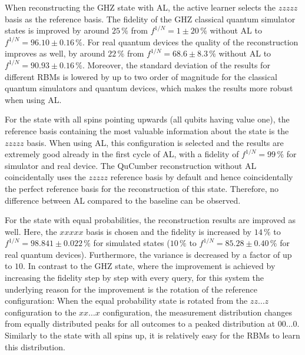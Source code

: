 \documentclass[pra,aps,showpacs,groupedaddress,superscriptaddress,twocolumn,toc=flat,biblatex,footinbib]{revtex4-1}
\begin{document}

When reconstructing the GHZ state with AL, the active learner selects the $zzzzz$ basis as the reference basis. The fidelity of the GHZ classical quantum simulator states is improved by around $25\,\%$ from $f^{1/N}=1\pm20\,\%$ without AL to $f^{1/N}=96.10\pm0.16\,\%$. For real quantum devices the quality of the reconstruction improves as well, by around $22\,\%$ from $f^{1/N}=68.6\pm8.3\,\%$ without AL to $f^{1/N}=90.93\pm0.16\,\%$. Moreover, the standard deviation of the results for different RBMs is lowered by up to two order of magnitude for the classical quantum simulators and quantum devices, which makes the results more robust when using AL.

For the state with all spins pointing upwards (all qubits having value one), the reference basis containing the most valuable information about the state is the $zzzzz$ basis. When using AL, this configuration is selected and the results are extremely good already in the first cycle of AL, with a fidelity of $f^{1/N}=99\,\%$ for simulator and real device. The QuCumber reconstruction without AL coincidentally uses the $zzzzz$ reference basis by default and hence coincidentally the perfect reference basis for the reconstruction of this state. Therefore, no difference between AL compared to the baseline can be observed.

For the state with equal probabilities, the reconstruction results are improved as well. Here, the $xxxxx$ basis is chosen and the fidelity is increased by $14\,\%$ to $f^{1/N}=98.841\pm 0.022\,\%$ for simulated states ($10\,\%$ to $f^{1/N}=85.28\pm 0.40\,\%$ for real quantum devices). Furthermore, the variance is decreased by a factor of up to $10$. In contrast to the GHZ state, where the improvement is achieved by increasing the fidelity step by step with every query, for this system the underlying reason for the improvement is the rotation of the reference configuration: When the equal probability state is rotated from the $zz\dots z$ configuration to the $xx\dots x$ configuration, the measurement distribution changes from equally distributed peaks for all outcomes to a peaked distribution at $00\dots 0$. Similarly to the state with all spins up, it is relatively easy for the RBMs to learn this distribution. 
\end{document}
